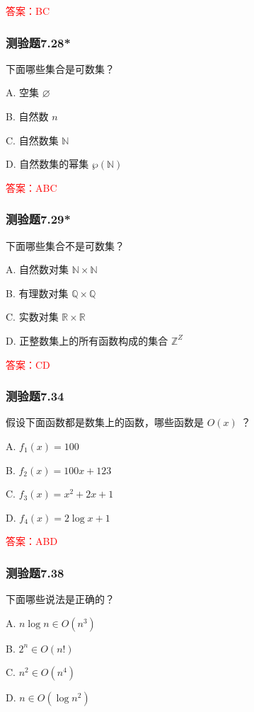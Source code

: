 \documentclass[UTF8, heading=true]{ctexart}
\begin{document}
\textcolor{red}{答案：BC}

\subsubsection{测验题7.28*}

下面哪些集合是可数集？

A. 空集 $\varnothing$

B. 自然数 $n$

C. 自然数集 $\mathbb{N}$

D. 自然数集的幂集 $\wp(\mathbb{N})$

\textcolor{red}{答案：ABC}

\subsubsection{测验题7.29*}

下面哪些集合不是可数集？

A. 自然数对集 $\mathbb{N} \times \mathbb{N}$

B. 有理数对集 $\mathbb{Q} \times \mathbb{Q}$

C. 实数对集 $\mathbb{R} \times \mathbb{R}$

D. 正整数集上的所有函数构成的集合 $\mathbb{Z}^Z$

\textcolor{red}{答案：CD}

\subsubsection{测验题7.34}

假设下面函数都是数集上的函数，哪些函数是 $O(x)$ ？

A. $f_1(x)=100$

B. $f_2(x)=100 x+123$

C. $f_3(x)=x^2+2 x+1$

D. $f_4(x)=2 \log x+1$

\textcolor{red}{答案：ABD}

\subsubsection{测验题7.38}

下面哪些说法是正确的？

A. $ n \log n \in O\left(n^3\right)$

B. $2^n \in O(n!)$

C. $n^2 \in O\left(n^4\right)$

D. $ n \in O\left(\log n^2\right)$
\end{document}
